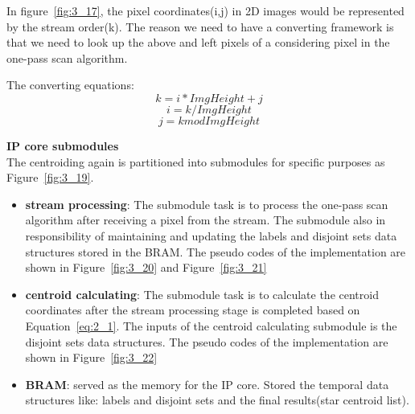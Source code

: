 
\noindent In figure~\ref{fig:3_17}, the pixel coordinates(i,j) in 2D images would be represented by the stream order(k). The reason we need to have a converting framework is that we need to look up the above and left pixels of a considering pixel in the one-pass scan algorithm. \\
	

\noindent The converting equations:
	$$k = i*ImgHeight + j$$
	$$i = k / ImgHeight$$
	$$j = k mod ImgHeight$$

\textbf{IP core submodules} \\

\noindent The centroiding again is partitioned into submodules for specific purposes as Figure~\ref{fig:3_19}.


\begin{itemize}
	\item \textbf{stream processing}: The submodule task is to process the one-pass scan algorithm after receiving a pixel from the stream. The submodule also in responsibility of maintaining and updating the labels and disjoint sets data structures stored in the BRAM. The pseudo codes of the implementation are shown in Figure~\ref{fig:3_20} and Figure~\ref{fig:3_21}
	\item \textbf{centroid calculating}: The submodule task is to calculate the centroid coordinates after the stream processing stage is completed based on Equation~\ref{eq:2_1}. The inputs of the centroid calculating submodule is the disjoint sets data structures. The pseudo codes of the implementation are shown in Figure~\ref{fig:3_22}
	\item \textbf{BRAM}: served as the memory for the IP core. Stored the temporal data structures like: labels and disjoint sets and the final results(star centroid list).
\end{itemize}





